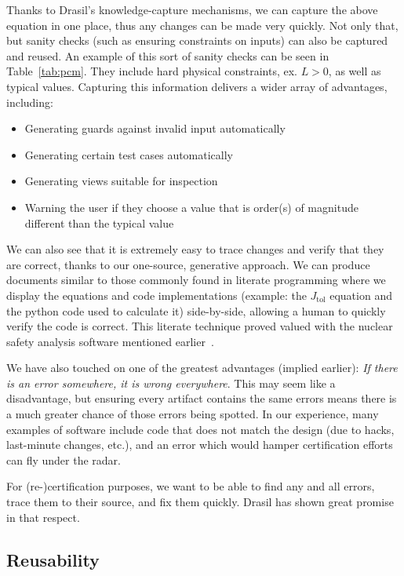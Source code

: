 \documentclass[sigconf]{acmart}
\newcommand{\jtol}{$J_{\mbox{tol}}$}
\begin{document}
{Thanks to Drasil's knowledge-capture mechanisms, we can capture the above 
equation in one place, thus any changes can be made very quickly. Not only 
that, but sanity checks (such as ensuring constraints on inputs) can also be 
captured and reused. An example of this sort of sanity checks can be seen in 
Table~\ref{tab:pcm}. They include hard physical constraints, ex. $L > 0$, as 
well as typical values. Capturing this information
delivers a wider array of advantages, including:

\begin{itemize}
\item Generating guards against invalid input automatically
\item Generating certain test cases automatically
\item Generating views suitable for inspection
\item Warning the user if they choose a value that is order(s) of magnitude different 
than the typical value
\end{itemize}
We can also see that it is extremely easy to trace changes and verify that they 
are correct, thanks to our one-source, generative approach. We can produce 
documents similar to those commonly found in literate programming where we 
display the equations and code implementations (example: the \jtol{} equation 
and the python code used to calculate it) side-by-side, allowing a human to 
quickly verify the code is correct.  This literate technique proved valued with
the nuclear safety analysis software mentioned
earlier~\cite{SmithAndKoothoor2016}.

We have also touched on one of the greatest advantages (implied 
earlier): \emph{If there is an error somewhere, it is wrong everywhere}. This 
may seem like a disadvantage, but ensuring every artifact contains the same 
errors means there is a much greater chance of those errors being spotted. In 
our experience, many examples of software include code that does not match the 
design (due to hacks, last-minute changes, etc.), and an error which would 
hamper certification efforts can fly under the radar. 

For (re-)certification purposes, we want to be able to find any and all errors, 
trace them to their source, and fix them quickly. Drasil has shown great 
promise in that respect.

\subsection{Reusability}

}
\end{document}
